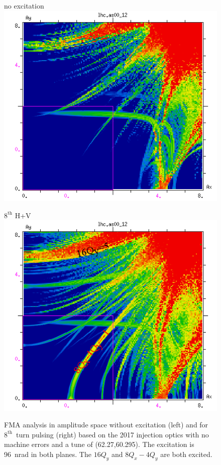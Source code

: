 \documentclass[%
 reprint,
 amsmath,amssymb,
 aps,
prstab,
]{revtex4-1}
\begin{document}
\begin{figure}[h]
	\begin{minipage}[t]{0.49\linewidth}
		\centering
		no excitation
		\includegraphics[width=1.0\linewidth]{2017injnocolc15o+19_6noerru_dp0_amp.png}
	\end{minipage}
	\begin{minipage}[t]{0.49\linewidth}
		\centering
		$8^{\mathrm{th}}$ H+V
		\includegraphics[width=1.0\linewidth]{2017injnocolc15o+19_6noerrut8skhv_dp0_amp_annotate.png}
	\end{minipage}	
	\caption{\label{fig:8th2017fmaamp} FMA analysis in amplitude space without excitation (left) and for $8^{\mathrm{th}}$~turn pulsing (right) based on the 2017 injection optics with no machine errors and a tune of (62.27,60.295). The excitation is 96~nrad in both planes. The $16Q_y$ and \mbox{$8Q_x-4Q_y$} are both excited.}
\end{figure}
\end{document}
